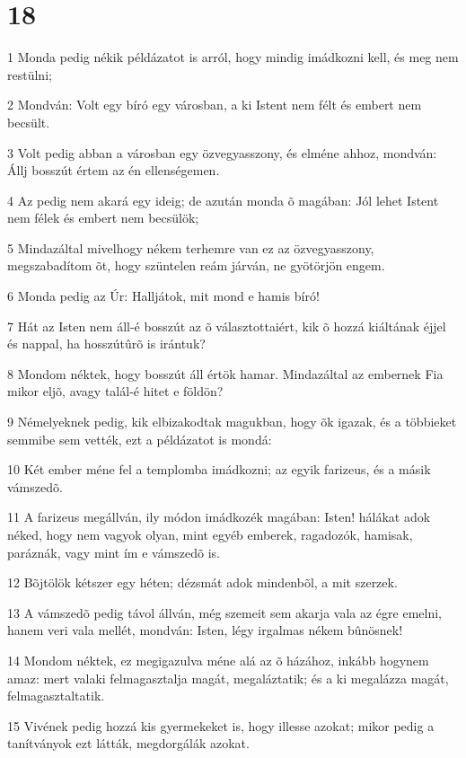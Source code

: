 \chapter{18}

\par 1 Monda pedig nékik példázatot is arról, hogy mindig imádkozni kell, és meg nem restülni;
\par 2 Mondván: Volt egy bíró egy városban, a ki Istent nem félt és embert nem becsült.
\par 3 Volt pedig abban a városban egy özvegyasszony, és elméne ahhoz, mondván: Állj bosszút értem az én ellenségemen.
\par 4 Az pedig nem akará egy ideig; de azután monda õ magában: Jól lehet Istent nem félek és embert nem becsülök;
\par 5 Mindazáltal mivelhogy nékem terhemre van ez az özvegyasszony, megszabadítom õt, hogy szüntelen reám járván, ne gyötörjön engem.
\par 6 Monda pedig az Úr: Halljátok, mit mond e hamis bíró!
\par 7 Hát az Isten nem áll-é bosszút az õ választottaiért, kik õ hozzá kiáltának éjjel és nappal, ha hosszútûrõ is irántuk?
\par 8 Mondom néktek, hogy bosszút áll értök hamar. Mindazáltal az embernek Fia mikor eljõ, avagy talál-é hitet e földön?
\par 9 Némelyeknek pedig, kik elbizakodtak magukban, hogy õk igazak, és a többieket semmibe sem vették, ezt a példázatot is mondá:
\par 10 Két ember méne fel a templomba imádkozni; az egyik farizeus, és a másik  vámszedõ.
\par 11 A farizeus megállván, ily módon imádkozék magában: Isten! hálákat adok néked, hogy nem vagyok olyan, mint egyéb emberek, ragadozók, hamisak, paráznák, vagy mint ím e vámszedõ is.
\par 12 Bõjtölök kétszer egy héten; dézsmát adok mindenbõl, a mit szerzek.
\par 13 A vámszedõ pedig távol állván, még szemeit sem akarja vala az égre emelni, hanem veri vala mellét, mondván: Isten, légy irgalmas nékem bûnösnek!
\par 14 Mondom néktek, ez megigazulva méne alá az õ házához, inkább hogynem amaz: mert valaki felmagasztalja magát, megaláztatik; és a ki megalázza magát, felmagasztaltatik.
\par 15 Vivének pedig hozzá kis gyermekeket is, hogy illesse azokat; mikor pedig a tanítványok ezt látták, megdorgálák azokat.
